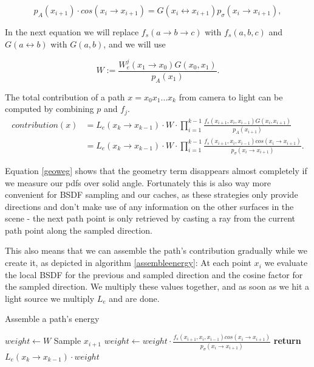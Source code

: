 \begin{equation}
\label{pdftrans}
p_A(x_{i+1}) \cdot cos(x_i \rightarrow x_{i+1}) = G(x_i \leftrightarrow x_{i+1}) p_\sigma(x_i \rightarrow x_{i+1}),
\end{equation}

In the next equation we will replace $f_s(a \rightarrow b \rightarrow c)$ with $f_s(a,b,c)$ and $G(a \leftrightarrow b)$ with $G(a,b)$, and we will use

\begin{equation*}
W :=  \frac{W_e^j(x_1 \rightarrow x_0) G(x_0,x_1)}{p_A(x_1)}.
\end{equation*}

The total contribution of a path $x=x_0x_1\dots x_k$ from camera to light can be computed by combining $p$ and $f_j$.
\pagebreak
\begin{equation}
\label{geoweg}
\begin{split}
contribution(x) &= L_e(x_k \rightarrow x_{k-1}) \cdot W \cdot \prod _{i=1}^{k-1} \frac{f_s(x_{i+1},x_i, x_{i-1}) G(x_i, x_{i+1})}{p_A(x_{i+1})}\\
&= L_e(x_k \rightarrow x_{k-1}) \cdot W \cdot \prod _{i=1}^{k-1} \frac{f_s(x_{i+1},x_i, x_{i-1}) cos (x_i \rightarrow x_{i+1})}{p_\sigma(x_i \rightarrow x_{i+1})}.
\end{split}
\end{equation}

Equation \ref{geoweg} shows that the geometry term disappears almost completely if we measure our pdfs over solid angle. Fortunately this is also way more convenient for BSDF sampling and our caches, as these strategies only provide directions and don't make use of any information on the other surfaces in the scene - the next path point is only retrieved by casting a ray from the current path point along the sampled direction.

This also means that we can assemble the path's contribution gradually while we create it, as depicted in algorithm \ref{assembleenergy}: At each point $x_i$ we evaluate the local BSDF for the previous and sampled direction and the cosine factor for the sampled direction. We multiply these values together, and as soon as we hit a light source we multiply $L_e$ and are done.

\begin{algorithm}
\caption{Assemble a path's energy}
\label{assembleenergy}
\begin{algorithmic}
\State $weight \gets W$
\State Sample $x_{i+1}$
\State $weight \gets weight \cdot \frac{f_s(x_{i+1},x_i,x_{i-1}) cos(x_i \rightarrow x_{i+1})}{p_\sigma(x_i \rightarrow x_{i+1})}$
\EndWhile
\State \textbf{return} $L_e(x_k \rightarrow x_{k-1}) \cdot weight$
\end{algorithmic}
\end{algorithm}



